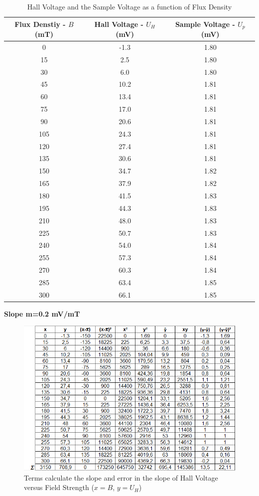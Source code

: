 \documentclass[a4paper,12pt]{article}
\begin{document}
\newpage
\begin{table}[h!]
	\begin{center}
		\begin{tabular}{|c|c|c|}
	\hline Flux Denstiy - $B$ (mT) & Hall Voltage - $U_{H}$ (mV) & Sample Voltage - $U_{p}$ (mV) \\ 
	\hline 0 & -1.3 & 1.80 \\ 
	\hline 15 & 2.5 & 1.80 \\ 
	\hline 30 & 6.0 & 1.80 \\ 
	\hline 45 & 10.2 & 1.81 \\ 
	\hline 60 & 13.4 & 1.81 \\ 
	\hline 75 & 17.0 & 1.81 \\ 
	\hline 90 & 20.6 & 1.81 \\ 
	\hline 105 & 24.3 & 1.81 \\ 
	\hline 120 & 27.4 & 1.81 \\ 
	\hline 135 & 30.6 & 1.81 \\ 
	\hline 150 & 34.7 & 1.82 \\ 
	\hline 165 & 37.9 & 1.82 \\ 
	\hline 180 & 41.5 & 1.83 \\ 
	\hline 195 & 44.3 & 1.83 \\ 
	\hline 210 & 48.0 & 1.83 \\ 
	\hline 225 & 50.7 & 1.83 \\ 
	\hline 240 & 54.0 & 1.84 \\ 
	\hline 255 & 57.3 & 1.84 \\ 
	\hline 270 & 60.3 & 1.84 \\ 
	\hline 285 & 63.4 & 1.85 \\ 
	\hline 300 & 66.1 & 1.85 \\ 
	\hline 
\end{tabular} 
\caption{Hall Voltage and the Sample Voltage as a function of Flux Density}
	\end{center}
\end{table}
\begin{center}
	\textbf{Slope m=0.2 mV/mT}
\end{center}
\begin{figure}[h!]
\centering
\includegraphics[width=0.8\linewidth, height=0.28\textheight]{Fig}
\caption{Terms calculate the slope and error in the slope of Hall Voltage versus Field Strength ($x=B$, $y=U_{H}$)}
\label{fig:Fig}
\end{figure}
\end{document}
